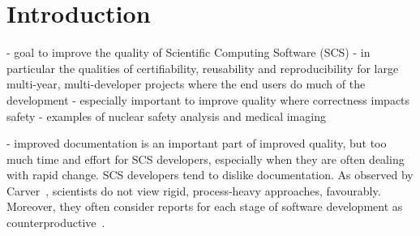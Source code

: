 \documentclass[sigconf]{acmart}
\begin{document}


\maketitle

\section{Introduction} \label{SecIntroduction}

- goal to improve the quality of Scientific Computing Software (SCS)
- in particular the qualities of certifiability, reusability and reproducibility
for large multi-year, multi-developer projects where the end users do much of
the development
- especially important to improve quality where correctness impacts safety
- examples of nuclear safety analysis and medical imaging

- improved documentation is an important part of improved quality, but too much
time and effort for SCS developers, especially when they are often dealing with
rapid change.  SCS developers tend to dislike documentation. As observed by
  Carver~\cite{CarverEtAl2007}, scientists do not view rigid, process-heavy
  approaches, favourably.  Moreover, they often consider reports for each stage
  of software development as counterproductive~\cite[p.~373]{Roache1998}.
\end{document}
